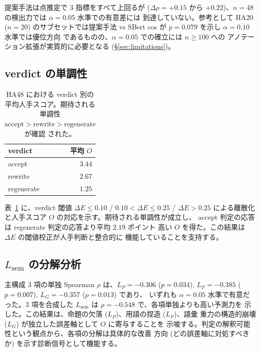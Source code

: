 提案手法は点推定で 3 指標をすべて上回るが ($\Delta \rho = +0.15$ から
$+0.22$)、$n = 48$ の検出力では $\alpha = 0.05$ 水準での有意差には
到達していない。参考として HA20 ($n = 20$) のサブセットでは提案手法
vs SBert cos が $p = 0.079$ を示し $\alpha = 0.10$ 水準では優位方向
であるものの、$\alpha = 0.05$ での確立には $n \geq 100$ への
アノテーション拡張が実質的に必要となる (\S\ref{sec:limitations})。

\subsection{verdict の単調性}
\label{sec:exp:verdict}

\begin{table}[t]
\centering
\caption{HA48 における verdict 別の平均人手スコア。期待される単調性
$\mathrm{accept} > \mathrm{rewrite} > \mathrm{regenerate}$ が確認
された。}
\label{tab:verdict_monotonicity}
\begin{tabular}{lr}
\toprule
verdict & 平均 $O$ \\
\midrule
accept & $3.44$ \\
rewrite & $2.67$ \\
regenerate & $1.25$ \\
\bottomrule
\end{tabular}
\end{table}

表~\ref{tab:verdict_monotonicity} に、verdict 閾値
$\Delta E \leq 0.10$ / $0.10 < \Delta E \leq 0.25$ / $\Delta E > 0.25$
による離散化と人手スコア $O$ の対応を示す。期待される単調性が成立し、
accept 判定の応答は regenerate 判定の応答より平均 $2.19$ ポイント
高い $O$ を得た。この結果は $\Delta E$ の閾値校正が人手判断と整合的に
機能していることを支持する。

\subsection{$L_{\mathrm{sem}}$ の分解分析}
\label{sec:exp:l_sem_breakdown}

主構成 3 項の単独 Spearman $\rho$ は、$L_P = -0.306$ ($p = 0.034$),
$L_F = -0.385$ ($p = 0.007$), $L_G = -0.357$ ($p = 0.013$) であり、
いずれも $\alpha = 0.05$ 水準で有意だった。3 項を合成した
$L_{\mathrm{sem}}$ は $\rho = -0.548$ で、各項単独よりも高い予測力を
示した。この結果は、命題の欠落 ($L_P$)、用語の捏造 ($L_F$)、語彙
重力の構造的崩壊 ($L_G$) が独立した誤差軸として $O$ に寄与することを
示唆する。判定の解釈可能性という観点から、各項の分解は具体的な改善
方向 (どの誤差軸に対処すべきか) を示す診断信号として機能する。
